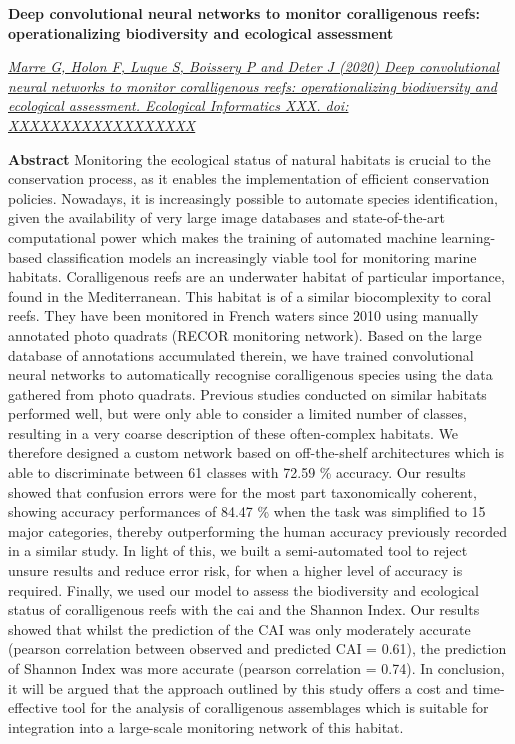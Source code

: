 \clearpage

\noindent\textbf{Deep convolutional neural networks to monitor coralligenous reefs: operationalizing biodiversity and ecological assessment}


\noindent\href{XXXXXXXXXX}{\textit{Marre G, Holon F, Luque S, Boissery P and Deter J (2020) Deep convolutional neural networks to monitor coralligenous reefs: operationalizing biodiversity and ecological assessment. Ecological Informatics XXX. doi: XXXXXXXXXXXXXXXXXX}}

\medskip

\noindent\textbf{Abstract}
Monitoring the ecological status of natural habitats is crucial to the conservation process, as it enables the implementation of efficient conservation policies. Nowadays, it is increasingly possible to automate species identification, given the availability of very large image databases and state-of-the-art computational power which makes the training of automated machine learning-based classification models an increasingly viable tool for monitoring marine habitats. Coralligenous reefs are an underwater habitat of particular importance, found in the Mediterranean. This habitat is of a similar biocomplexity to coral reefs. They have been monitored in French waters since 2010 using manually annotated photo quadrats (RECOR monitoring network). Based on the large database of annotations accumulated therein, we have trained convolutional neural networks to automatically recognise coralligenous species using the data gathered from photo quadrats. Previous studies conducted on similar habitats performed well, but were only able to consider a limited number of classes, resulting in a very coarse description of these often-complex habitats. We therefore designed a custom network based on off-the-shelf architectures which is able to discriminate between 61 classes with 72.59 \% accuracy. Our results showed that confusion errors were for the most part taxonomically coherent, showing accuracy performances of 84.47 \% when the task was simplified to 15 major categories, thereby outperforming the human accuracy previously recorded in a similar study. In light of this, we built a semi-automated tool to reject unsure results and reduce error risk, for when a higher level of accuracy is required. Finally, we used our model to assess the biodiversity and ecological status of coralligenous reefs with the \gls{cai} and the Shannon Index. Our results showed that whilst the prediction of the CAI was only moderately accurate (pearson correlation between observed and predicted CAI = 0.61), the prediction of Shannon Index was more accurate (pearson correlation = 0.74). In conclusion, it will be argued that the approach outlined by this study offers a cost and time-effective tool for the analysis of coralligenous assemblages which is suitable for integration into a large-scale monitoring network of this habitat.

